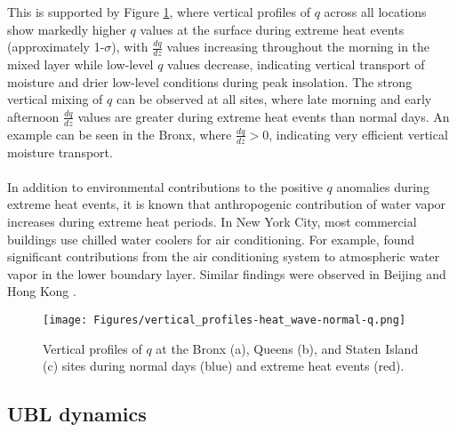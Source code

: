 \\ \\
This is supported by Figure \ref{fig:vertical_profiles-heat_wave-normal-q}, where vertical profiles of $q$ across all locations show markedly higher $q$ values at the surface during extreme heat events (approximately 1-$\sigma$), with $\frac{dq}{dz}$ values increasing throughout the morning in the mixed layer while low-level $q$ values decrease, indicating vertical transport of moisture and drier low-level conditions during peak insolation. The strong vertical mixing of $q$ can be observed at all sites, where late morning and early afternoon $\frac{dq}{dz}$ values are greater during extreme heat events than normal days. An example can be seen in the Bronx, where $\frac{dq}{dz} > 0$, indicating very efficient vertical moisture transport. 
\\ \\
In addition to environmental contributions to the positive $q$ anomalies during extreme heat events, it is known that anthropogenic contribution of water vapor increases during extreme heat periods. In New York City, most commercial buildings use chilled water coolers for air conditioning. For example, \citet{gutierrez2015} found significant contributions from the air conditioning system to atmospheric water vapor in the lower boundary layer. Similar findings were observed in Beijing \citep{yu2019} and Hong Kong \citep{wang2018}.

\begin{figure}[ht]
	\centering
	\texttt{[image: Figures/vertical\_profiles-heat\_wave-normal-q.png]}
	\caption{Vertical profiles of $q$ at the Bronx (a), Queens (b), and Staten Island (c) sites during normal days (blue) and extreme heat events (red).}
	\label{fig:vertical_profiles-heat_wave-normal-q}
\end{figure}

\FloatBarrier

\subsection{UBL dynamics}

